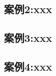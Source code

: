 \documentclass[lang=cn,newtx,14pt,scheme=chinese]{elegantbook}
\begin{document}
\subsection{案例2:xxx}
\subsection{案例3:xxx}
\subsection{案例4:xxx}







\end{document}
